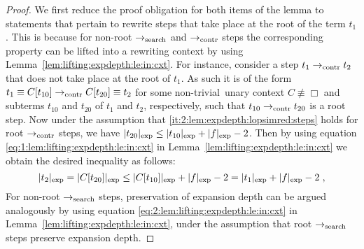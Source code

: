 \documentclass[
submission
]{dmtcs-episciences-tampered}
\newcommand{\indap}[2]{#1 _{#2}}
\newcommand{\nf}{\normalfont}
\newcommand{\punc}[1]{\ensuremath{\hspace*{3pt}{#1}}}
\newcommand{\bter}{t}
\newcommand{\bteri}{\indap{\bter}}
\newcommand{\afoscopesym}{f}
\newcommand{\cxtap}[2]{{#1}[#2]}
\newcommand{\acxt}{C}
\newcommand{\acxtap}{\cxtap{\acxt}}
\newcommand{\hole}{\Box}
\newcommand{\expdepth}[1]{\lvert{#1}\rvert_{\scriptexp}}
\newcommand{\sred}{\to}
\newcommand{\sredi}{\indap{\sred}}
\newcommand{\ssyntequal}{{\equiv}}
\newcommand{\syntequal}{\mathrel{\ssyntequal}}
\newcommand{\snotsyntequal}{{\not\equiv}}
\newcommand{\notsyntequal}{\mathrel{\snotsyntequal}}
\newcommand{\scriptexp}{\text{\nf exp}}
\newcommand{\scriptsearch}{\text{\nf search}}
\newcommand{\scriptcontract}{\text{\nf contr}}
\newcommand{\ssearchred}{\sredi{\scriptsearch}}
\newcommand{\scontractred}{\sredi{\scriptcontract}}
\newcommand{\contractred}{\mathrel{\scontractred}}
\newcommand{\nontrivial}{non-triv\-i\-al}
\theoremstyle{plain}
\theoremstyle{definition}
\begin{document}
\begin{proof}
  We first reduce the proof obligation for both items of the lemma
  to statements that pertain to rewrite steps that take place at the root of the term $\bteri{1}$. 
  This is because for non-root $\ssearchred$ and $\scontractred$ steps  
  the corresponding property can be lifted into a rewriting context by using Lemma~\ref{lem:lifting:expdepth:le:in:cxt}.
For instance, consider a step $\bteri{1} \contractred \bteri{2}$ that does not take place at the root of $\bteri{1}$. 
  As such it is of the form $\bteri{1} \syntequal \acxtap{\bteri{10}} \contractred \acxtap{\bteri{20}} \syntequal \bteri{2}$
  for some \nontrivial\ unary context $\acxt \notsyntequal \hole$ and subterms $\bteri{10}$ and $\bteri{20}$ of $\bteri{1}$ and $\bteri{2}$, respectively,
  such that $\bteri{10} \contractred \bteri{20}$ is a root step. 
  Now under the assumption that \eqref{it:2:lem:expdepth:lopsimred:steps} holds for root $\scontractred$ steps,
  we have $\expdepth{\bteri{20}} \le \expdepth{\bteri{10}} + \expdepth{\afoscopesym} - 2$. 
  Then by using equation \eqref{eq:1:lem:lifting:expdepth:le:in:cxt} in Lemma~\ref{lem:lifting:expdepth:le:in:cxt}
  we obtain the desired inequality as follows:
  \begin{equation*}
    \expdepth{\bteri{2}} = \expdepth{\acxtap{\bteri{20}}} 
                       \le \expdepth{\acxtap{\bteri{10}}} + \expdepth{\afoscopesym} - 2  
                       = \expdepth{\bteri{1}} + \expdepth{\afoscopesym} - 2 \punc{,}
  \end{equation*}
  For non-root $\ssearchred$ steps, preservation of expansion depth can be argued analogously
  by using equation \eqref{eq:2:lem:lifting:expdepth:le:in:cxt} in Lemma~\ref{lem:lifting:expdepth:le:in:cxt},
  under the assumption that root  $\ssearchred$ steps preserve expansion depth.



\end{proof}
\end{document}
